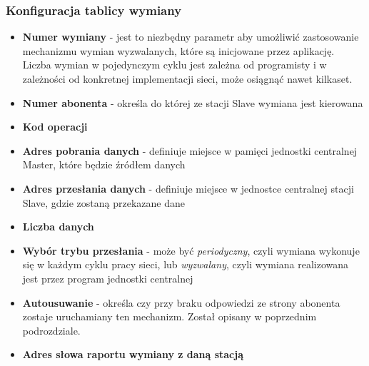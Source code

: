 \documentclass[a4paper,twoside]{article}
\begin{document}
	\subsubsection{Konfiguracja tablicy wymiany}
	\begin{itemize}
		\item \textbf{Numer wymiany} - jest to niezbędny parametr aby umożliwić zastosowanie mechanizmu wymian wyzwalanych, które są inicjowane przez aplikację. Liczba wymian w pojedynczym cyklu jest zależna od programisty i w zależności od konkretnej implementacji sieci, może osiągnąć nawet kilkaset.
		\item \textbf{Numer abonenta} - określa do której ze stacji Slave wymiana jest kierowana
		\item \textbf{Kod operacji}
		\item \textbf{Adres pobrania danych} - definiuje miejsce w pamięci jednostki centralnej Master, które będzie źródłem danych
		\item \textbf{Adres przesłania danych} - definiuje miejsce w jednostce centralnej stacji Slave, gdzie zostaną przekazane dane
		\item \textbf{Liczba danych}
		\item \textbf{Wybór trybu przesłania} - może być \textit{periodyczny}, czyli wymiana wykonuje się w każdym cyklu pracy sieci, lub \textit{wyzwalany}, czyli wymiana realizowana jest przez program jednostki centralnej
		\item \textbf{Autousuwanie} - określa czy przy braku odpowiedzi ze strony abonenta zostaje uruchamiany ten mechanizm. Został opisany w poprzednim podrozdziale.
		\item \textbf{Adres słowa raportu wymiany z daną stacją}
	\end{itemize}
\end{document}
